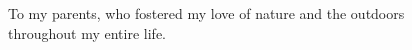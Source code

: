 \cleardoublepage
{}
{}
\vspace*{.1\textheight}
\begin{center}
  To my parents, who fostered my love of nature and the outdoors \\ throughout my entire life.
\end{center}
